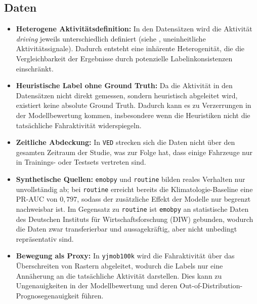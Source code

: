 \subsection*{Daten}
\begin{itemize}
    \item \textbf{Heterogene Aktivitätsdefinition:} In den Datensätzen wird die Aktivität \textit{driving} jeweils unterschiedlich definiert (siehe , uneinheitliche Aktivitätssignale). Dadurch entsteht eine inhärente Heterogenität, die die Vergleichbarkeit der Ergebnisse durch potenzielle Labelinkonsistenzen einschränkt.
    \item \textbf{Heuristische Label ohne Ground Truth:} Da die Aktivität in den Datensätzen nicht direkt gemessen, sondern heuristisch abgeleitet wird, existiert keine absolute Ground Truth. Dadurch kann es zu Verzerrungen in der Modellbewertung kommen, insbesondere wenn die Heuristiken nicht die tatsächliche Fahraktivität widerspiegeln.
    \item \textbf{Zeitliche Abdeckung:} In \texttt{VED} strecken sich die Daten nicht über den gesamten Zeitraum der Studie, was zur Folge hat, dass einige Fahrzeuge nur in Trainings- oder Testsets vertreten sind. 
    \item \textbf{Synthetische Quellen:} \texttt{emobpy} und \texttt{routine} bilden reales Verhalten nur unvollständig ab; bei \texttt{routine} erreicht bereits die Klimatologie-Baseline eine PR-AUC von $0,797$, sodass der zusätzliche Effekt der Modelle nur begrenzt nachweisbar ist. Im Gegensatz zu \texttt{routine} ist \texttt{emobpy} an statistische Daten des Deutschen Instituts für Wirtschaftsforschung (DIW) gebunden, wodurch die Daten zwar transferierbar und aussagekräftig, aber nicht unbedingt repräsentativ sind.
    \item \textbf{Bewegung als Proxy:} In \texttt{yjmob100k} wird die Fahraktivität über das Überschreiten von Rastern abgeleitet, wodurch die Labels nur eine Annäherung an die tatsächliche Aktivität darstellen. Dies kann zu Ungenauigkeiten in der Modellbewertung und deren Out-of-Distribution-Prognosegenauigkeit führen.
\end{itemize}

